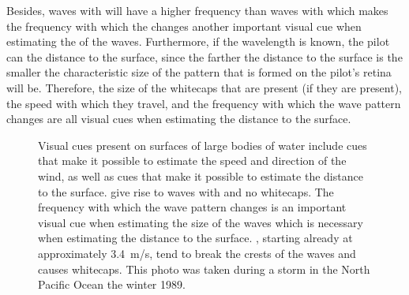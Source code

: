 Besides, waves with  will have a higher frequency than waves with  which makes the frequency with which the  changes another important visual cue when estimating the  of the waves. Furthermore, if the wavelength is known, the pilot can \estimate the distance to the surface, since the farther the distance to the surface is the smaller the characteristic size of the pattern that is formed on the pilot's retina will be. Therefore, the size of the whitecaps that are present (if they are present), the speed with which they travel, and the frequency with which the wave pattern changes are all visual cues when estimating the distance to the surface.

\begin{figure}
    \centering
    \caption{Visual cues present on surfaces of large bodies of water include cues that make it possible to estimate the speed and direction of the wind, as well as cues that make it possible to estimate the distance to the surface.   give rise to waves with  and no whitecaps. The frequency with which the wave pattern changes is an important visual cue when estimating the size of the waves which is necessary when estimating the distance to the surface.  , starting already at approximately 3.4~m/s, tend to break the crests of the waves and causes whitecaps. This photo was taken during a storm in the North Pacific Ocean the winter 1989.}
    \label{fig:sea_states}
\end{figure}

